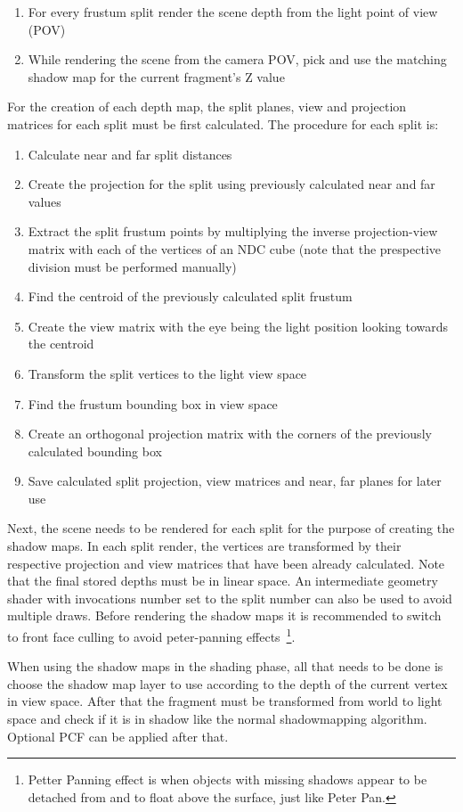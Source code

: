 \begin{enumerate}
\item For every frustum split render the scene depth from the light point of view (POV)
\item While rendering the scene from the camera POV, pick and use the matching shadow map for the current
    fragment's Z value
\end{enumerate}

For the creation of each depth map, the split planes, view and projection matrices for each split
must be first calculated. The procedure for each split is:

\begin{enumerate}
\item Calculate near and far split distances
\item Create the projection for the split using previously calculated near and far values
\item Extract the split frustum points by multiplying the inverse projection-view matrix
    with each of the vertices of an NDC cube (note that the prespective division must
    be performed manually)
\item Find the centroid of the previously calculated split frustum
\item Create the view matrix with the eye being the light position looking towards the centroid
\item Transform the split vertices to the light view space
\item Find the frustum bounding box in view space
\item Create an orthogonal projection matrix with the corners of the previously calculated bounding box
\item Save calculated split projection, view matrices and near, far planes for later use
\end{enumerate}

Next, the scene needs to be rendered for each split for the purpose of creating the shadow maps.
In each split render, the vertices are transformed by their respective projection and view matrices
that have been already calculated. Note that the final stored depths must be in linear space.
An intermediate geometry shader with invocations number set to the split number can also be used
to avoid multiple draws. Before rendering the shadow maps it is recommended to switch to front
face culling to avoid peter-panning effects~\footnote{Petter Panning effect is when objects with missing shadows
appear to be detached from and to float above the surface, just like Peter Pan.}.

When using the shadow maps in the shading phase, all that needs to be done is choose the shadow
map layer to use according to the depth of the current vertex in view space. After that
the fragment must be transformed from world to light space and check if it is in shadow like
the normal shadowmapping algorithm. Optional PCF can be applied after that.
